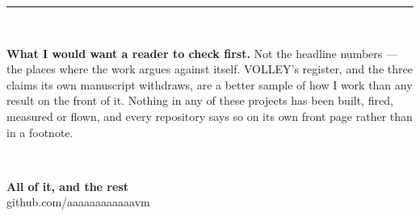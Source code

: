 \documentclass[10pt,a4paper]{article}
\newcommand{\hrulethin}{\textcolor{rule}{\rule{\linewidth}{0.4pt}}}
\begin{document}
\vspace{2.4mm}\hrulethin\\[1.8mm]
\begin{minipage}[t]{0.72\linewidth}
{\footnotesize\textbf{What I would want a reader to check first.} Not the headline numbers --- the
places where the work argues against itself. VOLLEY's register, and the three claims its own manuscript
withdraws, are a better sample of how I work than any result on the front of it. Nothing in
any of these projects has been built, fired, measured or flown, and every repository says so on its
own front page rather than in a footnote.\par}
\end{minipage}\hfill
\begin{minipage}[t]{0.24\linewidth}\raggedleft
{}\\[1.2mm]
{\scriptsize\textbf{All of it, and the rest}\\\textcolor{soft}{github.com/aaaaaaaaaaaavm}\par}
\end{minipage}
\end{document}
